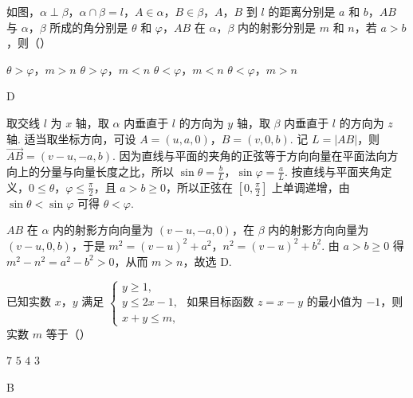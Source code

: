 \begin{problem}
如图，\(\alpha \perp \beta\)，\(\alpha \cap \beta = l\)，\(A \in \alpha\)，\(B \in \beta\)，\(A\)，\(B\) 到 \(l\) 的距离分别是 \(a\) 和 \(b\)，\(AB\) 与 \(\alpha\)，\(\beta\) 所成的角分别是 \(\theta\) 和 \(\varphi\)，\(AB\) 在 \(\alpha\)，\(\beta\) 内的射影分别是 \(m\) 和 \(n\)，若 \(a > b\)，则（\quad）


\choices
    {\(\theta > \varphi\)，\(m > n\)}
    {\(\theta >\varphi\)，\(m < n\)}
    {\(\theta < \varphi\)，\(m < n\)}
    {\(\theta < \varphi\)，\(m > n\)}
\end{problem}

\begin{answer}
D
\end{answer}

\begin{solution}
取交线 \(l\) 为 \(x\) 轴，取 \(\alpha\) 内垂直于 \(l\) 的方向为 \(y\) 轴，取 \(\beta\) 内垂直于 \(l\) 的方向为 \(z\) 轴. 适当取坐标方向，可设
\(A=(u,a,0)\)，\(B=(v,0,b)\).
记 \(L=|AB|\)，则 \(\overrightarrow{AB}=(v-u,-a,b)\). 因为直线与平面的夹角的正弦等于方向向量在平面法向方向上的分量与向量长度之比，所以
\(\sin\theta=\frac{b}{L}\)，\(\sin\varphi=\frac{a}{L}\).
按直线与平面夹角定义，\(0\leqslant\theta\)，\(\varphi\leqslant\frac{\pi}{2}\)，且 \(a>b\geqslant0\)，所以正弦在 \([0,\frac{\pi}{2}]\) 上单调递增，由 \(\sin\theta<\sin\varphi\) 可得 \(\theta<\varphi\).

\(AB\) 在 \(\alpha\) 内的射影方向向量为 \((v-u,-a,0)\)，在 \(\beta\) 内的射影方向向量为 \((v-u,0,b)\)，于是
\(m^2=(v-u)^2+a^2\)，\(n^2=(v-u)^2+b^2\).
由 \(a>b\geqslant0\) 得 \(m^2-n^2=a^2-b^2>0\)，从而 \(m>n\)，故选 D.
\end{solution}

\begin{problem}
已知实数 \(x\)，\(y\) 满足 \(\begin{cases}
y \geqslant 1,\\
y \leqslant 2x - 1,\\
x + y \leqslant m,
\end{cases}\) 如果目标函数 \(z = x - y\) 的最小值为 \(-1\)，则实数 \(m\) 等于（\quad）

\choices
    {\(7\)}
    {\(5\)}
    {\(4\)}
    {\(3\)}
\end{problem}

\begin{answer}
B
\end{answer}

